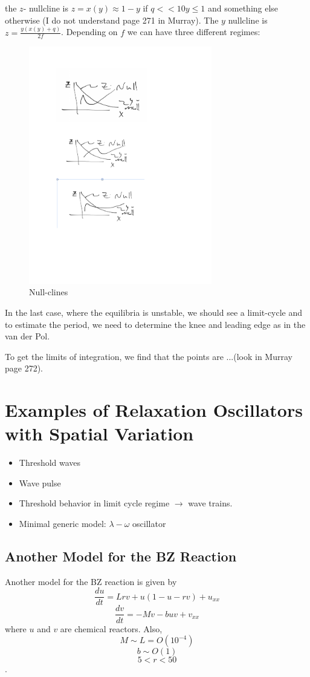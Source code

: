 \documentclass[]{article}
\numberwithin{equation}{section}		%
\begin{document}
the $z$- nullcline is $ z=x(y) \approx 1-y$ if $q<<10y\leq 1$ and something else otherwise (I do not understand page 271 in Murray). The $y$ nullcline is $z=\frac{y(x(y)+q)}{2f}$. Depending on $f$ we can have three different regimes:
\begin{figure}[b!]
\caption{Null-clines}
\begin{center}
\includegraphics[width=8cm]{figures/bz_3.pdf}
\end{center}
\label{fig:oscper}
\end{figure}
In the last case, where the equilibria is unstable, we should see a limit-cycle and to estimate the period, we need to determine the knee and leading edge as in the van der Pol. 

To get the limits of integration, we find that the points are ...(look in Murray page 272).


\section{Examples of Relaxation Oscillators with Spatial Variation}
\begin{itemize}
\item Threshold waves
\item Wave pulse
\item Threshold behavior in limit cycle regime $\rightarrow$ wave trains.
\item Minimal generic model: $ \lambda - \omega$ oscillator
\end{itemize}
\subsection{Another Model for the BZ Reaction}
Another model for the BZ reaction is given by
\begin{equation}\label{bz2u}
\frac{du}{dt} = Lrv+u(1-u-rv)+u_{xx}
\end{equation}
\begin{equation}\label{bz2v}
\frac{dv}{dt} = -Mv -buv+v_{xx}
\end{equation}
where $u$ and $v$ are chemical reactors. Also,
$$M\sim L=O(10^{-4})$$
$$b\sim O(1)$$
$$5<r<50$$.
\end{document}
